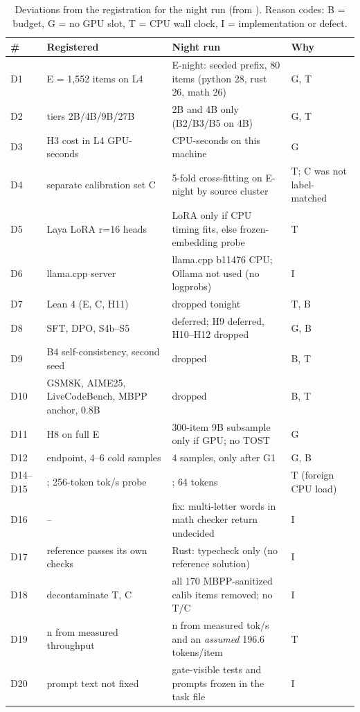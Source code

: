 \documentclass[11pt,a4paper]{article}
\newcommand{\code}[1]{\texttt{\detokenize{#1}}}
\begin{document}
\begin{table}[!htbp]\centering\scriptsize\setlength{\tabcolsep}{4pt}
\caption{Deviations from the registration for the night run (from \code{docs/DEVIATIONS.md}). Reason codes: B = budget, G = no GPU slot, T = CPU wall clock, I = implementation or defect.}
\label{tab:dev}
\begin{tabular}{l p{4.6cm} p{6.0cm} p{2.2cm}}\toprule
\# & Registered & Night run & Why\\\midrule
D1 & E = 1,552 items on L4 & E-night: seeded prefix, 80 items (python 28, rust 26, math 26) & G, T\\
D2 & tiers 2B/4B/9B/27B & 2B and 4B only (B2/B3/B5 on 4B) & G, T\\
D3 & H3 cost in L4 GPU-seconds & CPU-seconds on this machine & G\\
D4 & separate calibration set C & 5-fold cross-fitting on E-night by source cluster & T; C was not label-matched\\
D5 & Laya LoRA r=16 heads & LoRA only if CPU timing fits, else frozen-embedding probe & T\\
D6 & llama.cpp server & llama.cpp b11476 CPU; Ollama not used (no logprobs) & I\\
D7 & Lean 4 (E, C, H11) & dropped tonight & T, B\\
D8 & SFT, DPO, S4b--S5 & deferred; H9 deferred, H10--H12 dropped & G, B\\
D9 & B4 self-consistency, second seed & dropped & B, T\\
D10 & GSM8K, AIME25, LiveCodeBench, MBPP anchor, 0.8B & dropped & B, T\\
D11 & H8 on full E & 300-item 9B subsample only if GPU; no TOST & G\\
D12 & endpoint, 4--6 cold samples & 4 samples, only after G1 & G, B\\
D14--D15 & \code{-t 8}; 256-token tok/s probe & \code{-t 4}; 64 tokens & T (foreign CPU load)\\
D16 & -- & fix: multi-letter words in math checker return undecided & I\\
D17 & reference passes its own checks & Rust: typecheck only (no reference solution) & I\\
D18 & decontaminate T, C & all 170 MBPP-sanitized calib items removed; no T/C & I\\
D19 & n from measured throughput & n from measured tok/s and an \emph{assumed} 196.6 tokens/item & T\\
D20 & prompt text not fixed & gate-visible tests and prompts frozen in the task file & I\\

\end{tabular}
\end{table}
\end{document}
